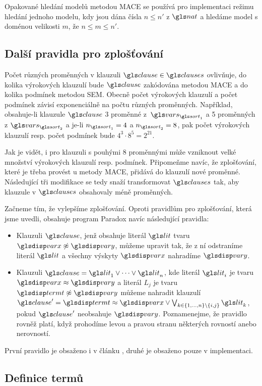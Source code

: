 Opakované hledání modelů metodou MACE se používá pro implementaci
režimu hledání jednoho modelu,
kdy jsou dána čísla $n \leq n'$ z $\nat$ a hledáme
model s doménou velikosti $m$, že $n \leq m \leq n'$.

\subsection{Další pravidla pro zplošťování}

Počet různých proměnných v klauzuli $\clause \in \clauses$
ovlivňuje, do kolika výrokových klauzulí bude $\clause$
zakódována metodou MACE a do kolika podmínek metodou SEM.
Obecně počet výrokových klauzulí a počet podmínek
závisí exponenciálně na počtu různých proměnných.
Například, obsahuje-li klauzule $\clause$ 3 proměnné z~$\vars_{\sort_1}$
a 5 proměnných z $\vars_{\sort_2}$ a je-li $n_{\sort_1} = 4$
a $n_{\sort_2} = 8$, pak počet výrokových klauzulí resp. počet podmínek
bude $4^3 \cdot 8^5 = 2^{21}$.

Jak je vidět, i pro klauzuli s pouhými 8 proměnnými může vzniknout
velké množství výrokových klauzulí resp. podmínek.
Připomeňme navíc, že zplošťování, které je třeba
provést u metody MACE, přidává do klauzulí nové proměnné.
Následující tři modifikace se tedy snaží transformovat
$\clauses$ tak, aby klauzule v $\clauses$ obsahovaly méně proměnných.

Začneme tím, že vylepšíme zplošťování. Oproti pravidlům
pro zplošťování, která jsme uvedli, obsahuje program Paradox \cite{paradox}
navíc následující pravidla:
\begin{itemize}
\item Klauzuli $\clause$, jenž obsahuje literál $\lit$ tvaru
  $\var \not\approx \varY$, můžeme upravit tak,
  že z ní odstraníme literál $\lit$ a všechny výskyty
  $\var$ nahradíme $\varY$.
\item Klauzuli $\clause = \lit_1 \vee \cdots \vee \lit_n$, kde literál
  $\lit_i$ je tvaru $\var \approx \varY$ a literál $L_j$ je tvaru
  $\term \not\approx \varY$ můžeme nahradit klauzulí
  $\clause' = \term \approx \var \vee
  \bigvee_{k \in \{ 1 \comdots n \} \setminus \{ i, j \}} \lit_k$, pokud $\clause'$
  neobsahuje $\varY$. Poznamenejme, že pravidlo rovněž platí,
  když prohodíme levou a pravou stranu některých rovností anebo nerovností.
\end{itemize}
První pravidlo je obsaženo i v článku \cite{claessen03paradox},
druhé je obsaženo pouze v implementaci.

\subsection{Definice termů}


